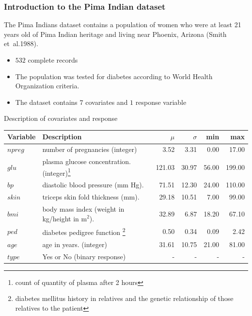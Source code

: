 \documentclass{beamer}
\begin{document}
\begin{frame}
\frametitle{Introduction to the Pima Indian dataset}
The Pima Indians dataset contains a population of women who were at least 21 years old of Pima Indian heritage and living near Phoenix, Arizona (Smith et~al.1988).
\begin{itemize}
\item $ 532$ complete records
\item The population was tested for diabetes according to World Health Organization criteria.
\item The dataset contains $7$ covariates and $1$ response variable
\end{itemize}
\end{frame}


\begin{frame}{Description of covariates and response}
\begin{tiny}
\begin{minipage}{\textwidth}
\centering
\begin{tabular}{|llrrrr|}
\hline
Variable & Description & $\mu$ & $\sigma$ & min & max \\ 
\hline
$npreg$      & number of pregnancies (integer)                                                                                     & 3.52   & 3.31  & 0.00  & 17.00  \\
$glu$   & plasma glucose concentration. (integer)\footnote{count of quantity of plasma after 2 hours} & 121.03 & 30.97 & 56.00 & 199.00 \\
$bp$         & diastolic blood pressure (mm Hg).                                                                                   & 71.51  & 12.30 & 24.00 & 110.00 \\
$skin $      & triceps skin fold thickness (mm).                                                                                   & 29.18  & 10.51 & 7.00  & 99.00  \\
$bmi $       & body mass index (weight in kg/height in m$^2$).                                    & 32.89  & 6.87  & 18.20 & 67.10  \\
$ped$        & diabetes pedigree function \footnote{diabetes mellitus history in relatives and the genetic relationship of those relatives to the patient }                                                                               & 0.50   & 0.34  & 0.09  & 2.42   \\
$age$        & age in years. (integer)                                                                                             & 31.61  & 10.75 & 21.00 & 81.00  \\
\hline
$type $      & Yes or No (binary response)                                                & -      & -     & -     & -     \\
\hline
\end{tabular}
\end{minipage}
\end{tiny}
\end{frame}
\end{document}
